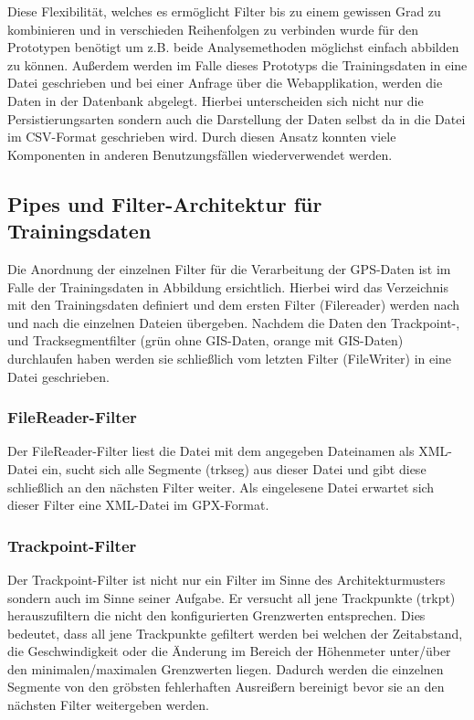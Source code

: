 Diese Flexibilität, welches es ermöglicht Filter bis zu einem gewissen Grad zu kombinieren und in verschieden Reihenfolgen zu verbinden wurde für den Prototypen benötigt um z.B. beide Analysemethoden möglichst einfach abbilden zu können. Außerdem werden im Falle dieses Prototyps die Trainingsdaten in eine Datei geschrieben und bei einer Anfrage über die Webapplikation, werden die Daten in der Datenbank abgelegt. Hierbei unterscheiden sich nicht nur die Persistierungsarten sondern auch die Darstellung der Daten selbst da in die Datei im CSV-Format geschrieben wird. Durch diesen Ansatz konnten viele Komponenten in anderen Benutzungsfällen wiederverwendet werden.

\subsection{Pipes und Filter-Architektur für Trainingsdaten}
Die Anordnung der einzelnen Filter für die Verarbeitung der GPS-Daten ist im Falle der Trainingsdaten in Abbildung  ersichtlich. Hierbei wird das Verzeichnis mit den Trainingsdaten definiert und dem ersten Filter (Filereader) werden nach und nach die einzelnen Dateien übergeben. Nachdem die Daten den Trackpoint-, und Tracksegmentfilter (grün ohne GIS-Daten, orange mit GIS-Daten) durchlaufen haben werden sie schließlich vom letzten Filter (FileWriter) in eine Datei geschrieben.


\subsubsection{FileReader-Filter}
Der FileReader-Filter liest die Datei mit dem angegeben Dateinamen als XML-Datei ein, sucht sich alle Segmente (trkseg) aus dieser Datei und gibt diese schließlich an den nächsten Filter weiter. Als eingelesene Datei erwartet sich dieser Filter eine XML-Datei im GPX-Format.

\subsubsection{Trackpoint-Filter}
Der Trackpoint-Filter ist nicht nur ein Filter im Sinne des Architekturmusters sondern auch im Sinne seiner Aufgabe. Er versucht all jene Trackpunkte (trkpt) herauszufiltern die nicht den konfigurierten Grenzwerten entsprechen. Dies bedeutet, dass all jene Trackpunkte gefiltert werden bei welchen der Zeitabstand, die Geschwindigkeit oder die Änderung im Bereich der Höhenmeter unter/über den minimalen/maximalen Grenzwerten liegen. Dadurch werden die einzelnen Segmente von den gröbsten fehlerhaften Ausreißern bereinigt bevor sie an den nächsten Filter weitergeben werden.

